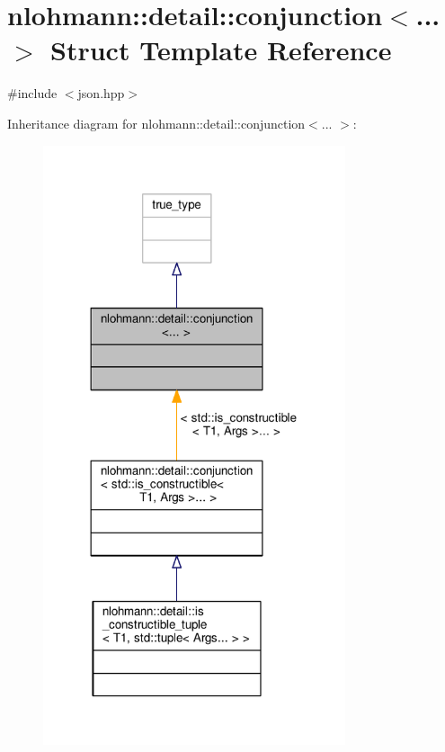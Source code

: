 \hypertarget{structnlohmann_1_1detail_1_1conjunction}{}\section{nlohmann\+:\+:detail\+:\+:conjunction$<$... $>$ Struct Template Reference}
\label{structnlohmann_1_1detail_1_1conjunction}


{\ttfamily \#include $<$json.\+hpp$>$}



Inheritance diagram for nlohmann\+:\+:detail\+:\+:conjunction$<$... $>$\+:
\nopagebreak
\begin{figure}[H]
\begin{center}
\leavevmode
\includegraphics[width=252pt]{structnlohmann_1_1detail_1_1conjunction__inherit__graph}
\end{center}
\end{figure}


